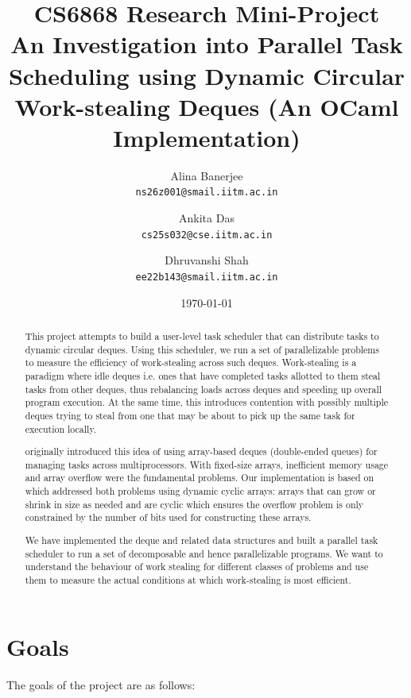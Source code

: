 \documentclass[11pt,a4paper]{article}
\title{%
  \textbf{CS6868 Research Mini-Project} \\[0.3em]
  \Large An Investigation into Parallel Task Scheduling using Dynamic
  Circular Work-stealing Deques (An OCaml Implementation)
}
\author{%
  Alina Banerjee \\ \texttt{ns26z001@smail.iitm.ac.in}
  \and
  Ankita Das \\ \texttt{cs25s032@cse.iitm.ac.in}
  \and
  Dhruvanshi Shah\\ \texttt{ee22b143@smail.iitm.ac.in}
}
\date{\today}
\begin{document}
\maketitle

\begin{abstract}

This project attempts to build a user-level task scheduler that can distribute
tasks to dynamic circular deques. Using this scheduler, we run a set of parallelizable
problems to measure
the efficiency of work-stealing across such deques. Work-stealing is a paradigm
where idle deques i.e. ones that have completed tasks allotted to them steal
tasks from other deques, thus rebalancing loads across deques and speeding up
overall program execution. At the same time, this introduces contention with
possibly multiple deques trying to steal from one that may be about to pick up
the same task for execution locally.

\cite{arora1998thread} originally introduced this idea of using array-based
deques (double-ended queues) for managing tasks across multiprocessors.
With fixed-size arrays, inefficient memory usage and array overflow were the
fundamental problems. Our
implementation is based on \cite{chase2005dynamic} which addressed both problems
using dynamic cyclic arrays: arrays that can grow or shrink in size as needed and
are cyclic which ensures the overflow problem is only constrained by the number
of bits used for constructing these arrays.

We have implemented the deque and related data structures and built a parallel task
scheduler to run a set of decomposable and hence parallelizable programs. We
want to understand the behaviour of work stealing for different classes of
problems and use them to measure the actual conditions at which work-stealing
is most efficient.

\end{abstract}

\section{Goals}
\label{sec:goals}

The goals of the project are as follows:
\end{document}

